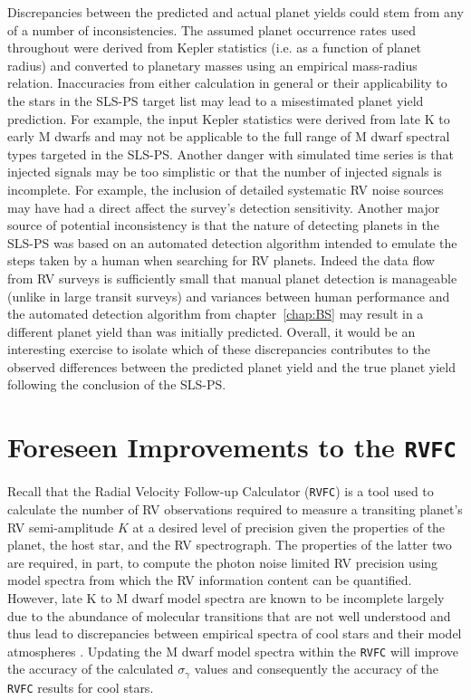 Discrepancies between the predicted and actual planet yields could stem
from any of a number of inconsistencies. The assumed planet occurrence rates used
throughout were derived from Kepler statistics (i.e. as a function of planet 
radius) and converted to planetary masses
using an empirical mass-radius relation. Inaccuracies from either calculation
in general or their applicability to the stars in the SLS-PS target list may
lead to a misestimated planet yield prediction. For example, the input Kepler
statistics were derived from late K to early M dwarfs \citep{dressing15a} and
may not be applicable to the full range of M dwarf spectral types targeted in
the SLS-PS. Another danger with simulated time series is that injected signals
may be too simplistic or that the number of injected signals is incomplete. For
example, the inclusion of detailed systematic RV noise sources may have had a
direct affect the
survey's detection sensitivity. Another major source of potential inconsistency
is that the nature of detecting planets in the SLS-PS was based on an automated
detection algorithm intended to emulate the steps taken by a human when
searching for RV planets. Indeed the data flow from RV surveys is sufficiently
small that manual planet detection is manageable (unlike in large transit
surveys) and variances between human performance and the automated detection
algorithm from chapter~\ref{chap:BS} may result in a different planet yield than
was initially predicted. Overall, it would be an interesting exercise to
isolate which of these discrepancies contributes to the observed differences
between the predicted planet yield and the true planet yield following the
conclusion of the SLS-PS.

\section{Foreseen Improvements to the \texttt{RVFC}}
Recall that the Radial Velocity Follow-up Calculator (\texttt{RVFC}) is a tool
used to calculate the number of RV observations required to measure a transiting
planet's RV semi-amplitude $K$ at a desired level of precision given the properties
of the planet, the host star, and the RV spectrograph. The properties of the latter two
are required, in part, to compute the photon noise limited RV precision using
model spectra from which the RV information content can be quantified. However,
late K to M dwarf model spectra are known to be incomplete largely due to the
abundance of molecular transitions that are not well understood and thus lead to
discrepancies between empirical spectra of cool stars and their model atmospheres
\citep{passegger16,behmard19}. Updating the M dwarf model spectra within the
\texttt{RVFC} will improve the accuracy of the calculated $\sigma_{\gamma}$ values
and consequently the accuracy of the \texttt{RVFC} results for cool stars. \\

